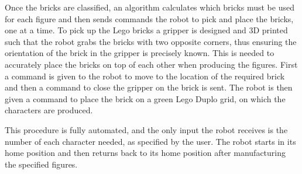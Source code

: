 Once the bricks are classified, an algorithm calculates which bricks must be used for each figure and then sends commands the robot to pick and place the bricks, one at a time. To pick up the Lego bricks a gripper is designed and 3D printed such that the robot grabs the bricks with two opposite corners, thus ensuring the orientation of the brick in the gripper is precisely known. This is needed to accurately place the bricks on top of each other when producing the figures. First a command is given to the robot to move to the location of the required brick and then a command to close the gripper on the brick is sent. The robot is then given a command to place the brick on a green Lego Duplo grid, on which the characters are produced.

This procedure is fully automated, and the only input the robot receives is the number of each character needed, as specified by the user. The robot starts in its home position and then returns back to its home position after manufacturing the specified figures.



